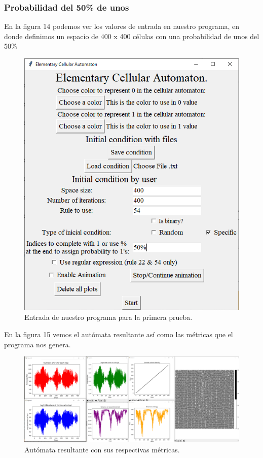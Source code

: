 \documentclass[11pt]{article}
\begin{document}
 		\subsubsection{Probabilidad del 50\% de unos}
		En la figura 14 podemos ver los valores de entrada en nuestro programa, en donde definimos un espacio de 400 x 400 células con una probabilidad de unos del 50\%		
		\begin{figure}[H]
			\centering
			\includegraphics[scale=0.5]{resources/RegEx54/50_prob_entrada.png}
			\caption{Entrada de nuestro programa para la primera prueba.}\label{fig:picture}
		\end{figure}
		En la figura 15 vemos el autómata resultante así como las métricas que el programa nos genera.
		\begin{figure}[H]
			\includegraphics[scale=0.26]{resources/RegEx54/50_prob_result.png}
			\caption{Autómata resultante con sus respectivas métricas.}\label{fig:picture}
		\end{figure}		
\end{document}
